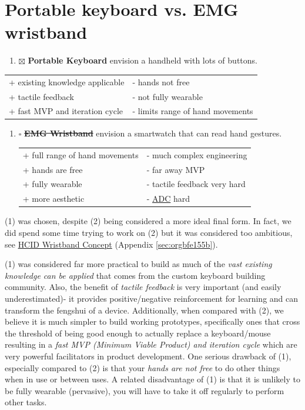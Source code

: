 \documentclass[logo,bsc,singlespacing,parskip]{infthesis}
\begin{document}
\section{Portable keyboard vs. EMG wristband}
\label{sec:org16fb948}
\begin{enumerate}
\item{$\boxtimes$} \textbf{Portable Keyboard} envision a handheld with lots of buttons.
\end{enumerate}
\begin{longtable}{|p{6.25cm}|p{6.25cm}|}
\hline
+ existing knowledge applicable & - hands not free\\
+ tactile feedback & - not fully wearable\\
+ fast MVP and iteration cycle & - limits range of hand movements\\
\hline
\end{longtable}
\begin{enumerate}
\item{$\square$} \sout{\textbf{EMG Wristband}} envision a smartwatch that can read hand gestures.
\begin{longtable}{|p{6.25cm}|p{6.25cm}|}
\hline
+ full range of hand movements & - much complex engineering\\
+ hands are free & - far away MVP\\
+ fully wearable & - tactile feedback very hard\\
+ more aesthetic & - \hyperref[org44fccbb]{ADC} hard\\
\hline
\end{longtable}
\end{enumerate}

(1) was chosen, despite (2) being considered a more ideal final form.
In fact, we did spend some time trying to work on (2) but it was considered too ambitious, see \hyperref[sec:orgbfe155b]{HCID Wristband Concept} (Appendix \ref{sec:orgbfe155b}).

(1) was considered far more practical to build as much of the \emph{vast existing knowledge can be applied} that comes from the custom keyboard building community.
Also, the benefit of \emph{tactile feedback} is very important (and easily underestimated)- it provides positive/negative reinforcement for learning and can transform the fengshui of a device.
Additionally, when compared with (2), we believe it is much simpler to build working prototypes, specifically ones that cross the threshold of being good enough to actually replace a keyboard/mouse resulting in a \emph{fast MVP (Minimum Viable Product) and iteration cycle} which are very powerful facilitators in product development.
One serious drawback of (1), especially compared to (2) is that your \emph{hands are not free} to do other things when in use or between uses. A related disadvantage of (1) is that it is unlikely to be fully wearable (pervasive), you will have to take it off regularly to perform other tasks.
\end{document}
